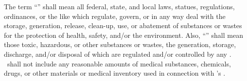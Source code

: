 The term “\environmentallaw” shall mean all federal, state, and local laws, statues, regulations, ordinances, or the like which regulate, govern, or in any way deal with the storage, generation, release, clean-up, use, or abatement of substances or wastes for the protection of health, safety, and/or the environment. Also, “\hazardoussubstances” shall mean those toxic, hazardous, or other substances or wastes, the generation, storage, discharge, and/or disposal of which are regulated and/or controlled by any \environmentallaw. \hazardoussubstances\ shall not include any reasonable amounts of medical substances, chemicals, drugs, or other materials or medical inventory used in connection with \lessee’s \permitteduse.
